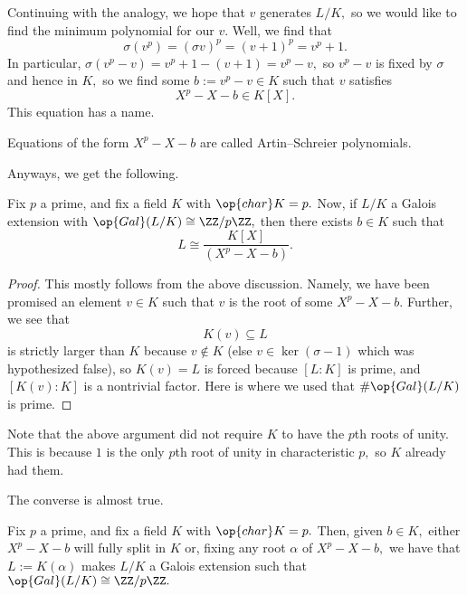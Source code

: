 \documentclass[../notes.tex]{subfiles}
\begin{document}
Continuing with the analogy, we hope that $v$ generates $L/K,$ so we would like to find the minimum polynomial for our $v.$ Well, we find that
\[\sigma\left(v^p\right)=(\sigma v)^p=(v+1)^p=v^p+1.\]
In particular, $\sigma\left(v^p-v\right)=v^p+1-(v+1)=v^p-v,$ so $v^p-v$ is fixed by $\sigma$ and hence in $K,$ so we find some $b:=v^p-v\in K$ such that $v$ satisfies
\[X^p-X-b\in K[X].\]
This equation has a name.
\begin{definition}
	Equations of the form $X^p-X-b$ are called Artin--Schreier polynomials.
\end{definition}
Anyways, we get the following.
\begin{theorem}
	Fix $p$ a prime, and fix a field $K$ with $\op{char}K=p.$ Now, if $L/K$ a Galois extension with $\op{Gal}(L/K)\cong\ZZ/p\ZZ,$ then there exists $b\in K$ such that
	\[L\cong\frac{K[X]}{\left(X^p-X-b\right)}.\]
\end{theorem}
\begin{proof}
	This mostly follows from the above discussion. Namely, we have been promised an element $v\in K$ such that $v$ is the root of some $X^p-X-b.$ Further, we see that
	\[K(v)\subseteq L\]
	is strictly larger than $K$ because $v\notin K$ (else $v\in\ker(\sigma-1)$ which was hypothesized false), so $K(v)=L$ is forced because $[L:K]$ is prime, and $[K(v):K]$ is a nontrivial factor. Here is where we used that $\#\op{Gal}(L/K)$ is prime.
\end{proof}
\begin{remark}[Nir]
	Note that the above argument did not require $K$ to have the $p$th roots of unity. This is because $1$ is the only $p$th root of unity in characteristic $p,$ so $K$ already had them.
\end{remark}
The converse is almost true.
\begin{proposition}
	Fix $p$ a prime, and fix a field $K$ with $\op{char}K=p.$ Then, given $b\in K,$ either $X^p-X-b$ will fully split in $K$ or, fixing any root $\alpha$ of $X^p-X-b,$ we have that $L:=K(\alpha)$ makes $L/K$ a Galois extension such that $\op{Gal}(L/K)\cong\ZZ/p\ZZ.$
\end{proposition}
\end{document}
